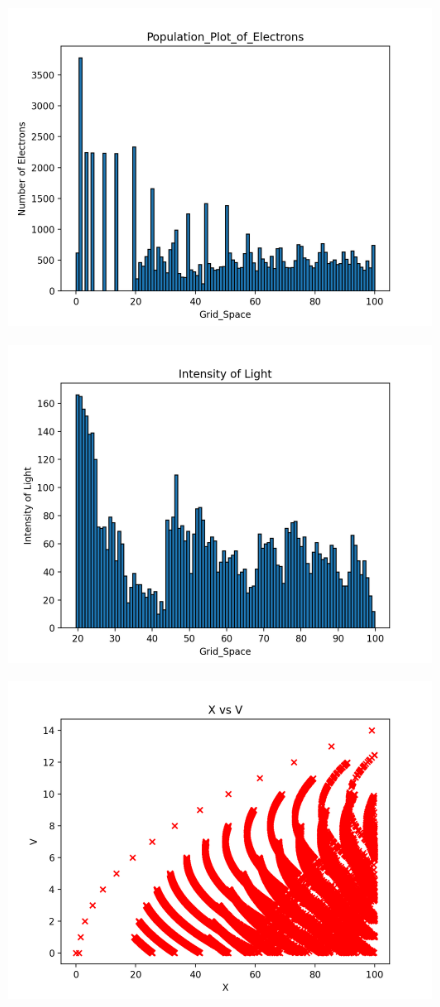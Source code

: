 \documentclass[11pt, a4paper]{article}
\begin{document}
\begin{figure}[!tbh]
    \centering
    \includegraphics[scale = 0.7]{default_1_1.png}
\end{figure}
\begin{figure}[!tbh]
    \centering
    \includegraphics[scale = 0.7]{default_2_1.png}
\end{figure}
\begin{figure}[!tbh]
    \centering
    \includegraphics[scale = 0.7]{default_3_1.png}
\end{figure}\newpage
\end{document}
